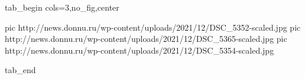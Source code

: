  
 
 
 
 


\ifcmt
  tab_begin cols=3,no_fig,center

     pic http://news.donnu.ru/wp-content/uploads/2021/12/DSC_5352-scaled.jpg
		 pic http://news.donnu.ru/wp-content/uploads/2021/12/DSC_5365-scaled.jpg
		 pic http://news.donnu.ru/wp-content/uploads/2021/12/DSC_5354-scaled.jpg

  tab_end
\fi
